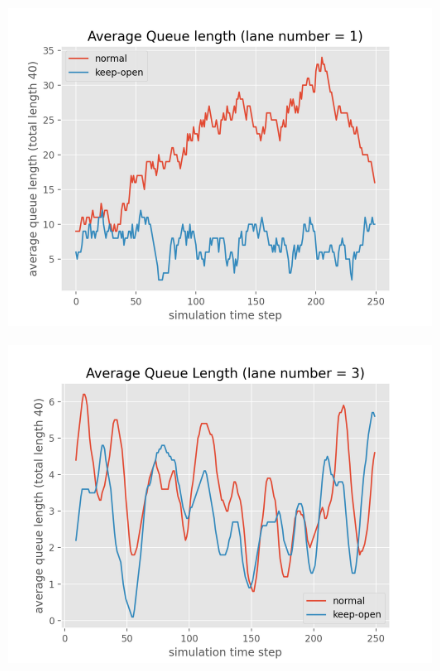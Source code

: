 \begin{figure}[ht]
    \centering
    \begin{minipage}[c]{0.45\textwidth}
        \centering
        \includegraphics[width=.9\textwidth]{images/queue_length_poisson_one_lane_low.png}
        \label{fig:one-lane-low-poisson}
    \end{minipage}
    \begin{minipage}[c]{0.45\textwidth}
        \centering
        \includegraphics[width=.9\textwidth]{images/queue_length_poisson_three_lane_low_ma.png}
        \label{fig:three-lane-low-poisson}
    \end{minipage}
    \begin{minipage}[c]{0.45\textwidth}
        \centering

\end{minipage}
\end{figure}
